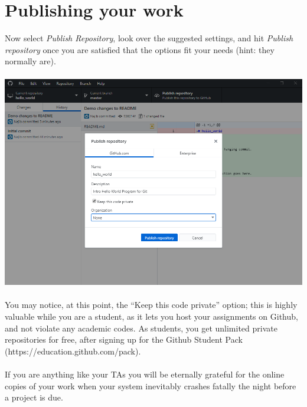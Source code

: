 \documentclass[12pt, letter]{article}
\begin{document}
    \section{Publishing your work}
    Now select \emph{Publish Repository}, look over the suggested settings, and hit \emph{Publish repository} once you are satisfied that the options fit your needs (hint: they normally are). \\ \\ %
    \includegraphics{screenshots/shot6.bmp}
    \\ \\
    You may notice, at this point, the ``Keep this code private'' option; this is highly valuable while you are a student, as it lets you host your assignments on Github, and not violate any academic codes. As students, you get unlimited private repositories for free, after signing up for the Github Student Pack (https://education.github.com/pack).
    \\ \\
    If you are anything like your TAs you will be eternally grateful for the online copies of your work when your system inevitably crashes fatally the night before a project is due.
\end{document}
